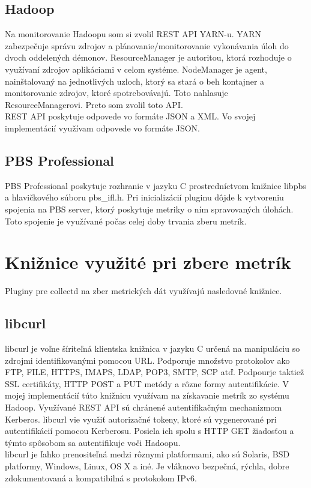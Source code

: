 \documentclass[printed,11pt,twoside,color,cover,table]{fithesis3}
\begin{document}
\subsection{Hadoop}
Na monitorovanie Hadoopu som si zvolil REST API YARN-u. YARN zabezpečuje správu zdrojov a plánovanie/monitorovanie vykonávania úloh do dvoch
oddelených démonov.\cite{hadoop-yarn} 
ResourceManager je autoritou, ktorá rozhoduje o využívaní zdrojov aplikáciami v celom systéme. NodeManager
je agent, nainštalovaný na jednotlivých uzloch, ktorý sa stará o beh kontajner a monitorovanie zdrojov, ktoré spotrebovávajú. Toto
nahlasuje ResourceManagerovi. Preto som zvolil toto API.
\\REST API poskytuje odpovede vo formáte JSON a XML. Vo svojej implementácií využívam odpovede vo formáte JSON.

\subsection{PBS Professional}
PBS Professional poskytuje rozhranie v jazyku C prostredníctvom knižnice libpbs a hlavičkového súboru pbs\_ifl.h. Pri inicializácií
pluginu dôjde k vytvoreniu spojenia na PBS server, ktorý poskytuje metriky o ním spravovaných úlohách. Toto spojenie je využívané
počas celej doby trvania zberu metrík.

\section{Knižnice využité pri zbere metrík}
Pluginy pre collectd na zber metrických dát využívajú nasledovné knižnice. 

\subsection{libcurl}
libcurl je voľne šíriteľná klientska knižnica v jazyku C určená na manipuláciu so zdrojmi identifikovanými pomocou URL. Podporuje
množstvo protokolov ako FTP, FILE, HTTPS, IMAPS, LDAP, POP3, SMTP, SCP atď. Podpourje taktiež SSL certifikáty,
HTTP POST a PUT metódy a rôzne formy autentifikácie. V mojej implementácií túto knižnicu využívam na získavanie metrík zo systému
Hadoop. Využívané REST API sú chránené autentifikačným mechanizmom Kerberos. libcurl vie využiť autorizačné tokeny,
ktoré sú vygenerované pri autentifikácií pomocou Kerberosu. Posiela ich spolu s HTTP GET žiadosťou a týmto spôsobom
sa autentifikuje voči Hadoopu.
\\libcurl je ľahko prenositeľná medzi rôznymi platformami, ako sú Solaris, BSD platformy, Windows, Linux, OS X a iné. Je vláknovo
bezpečná, rýchla, dobre zdokumentovaná a kompatibilná s protokolom IPv6. \cite{libcurl}
\end{document}
